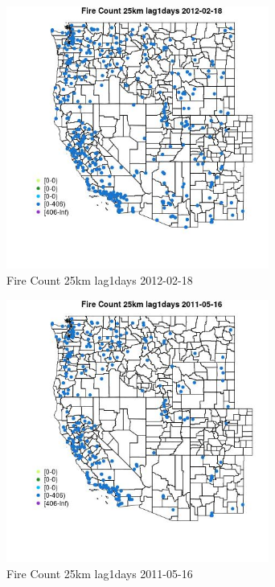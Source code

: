 \begin{figure} 
\centering  
\includegraphics[width=0.77\textwidth]{Code_Outputs/Report_ML_input_PM25_Step4_part_f_de_duplicated_aveswNAs_MapObsFire_Count_25km_lag1days2012-02-18.jpg} 
\caption{\label{fig:Report_ML_input_PM25_Step4_part_f_de_duplicated_aveswNAsMapObsFire_Count_25km_lag1days2012-02-18}Fire Count 25km lag1days 2012-02-18} 
\end{figure} 
 

\begin{figure} 
\centering  
\includegraphics[width=0.77\textwidth]{Code_Outputs/Report_ML_input_PM25_Step4_part_f_de_duplicated_aveswNAs_MapObsFire_Count_25km_lag1days2011-05-16.jpg} 
\caption{\label{fig:Report_ML_input_PM25_Step4_part_f_de_duplicated_aveswNAsMapObsFire_Count_25km_lag1days2011-05-16}Fire Count 25km lag1days 2011-05-16} 
\end{figure} 
 

